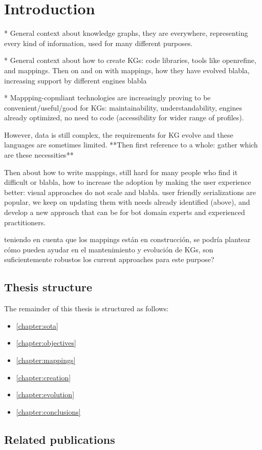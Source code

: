 \chapter{Introduction}
\label{chapter:intro}


* General context about knowledge graphs, they are everywhere, representing every kind of information, used for many different purposes. 

* General context about how to create KGs: code libraries, tools like openrefine, and mappings. Then on and on with mappings, how they have evolved blabla, increasing support by different engines blabla

* Mappping-copmliant technologies are increasingly proving to be convenient/useful/good for KGs: maintainability, understandability, engines already optimized, no need to code (accessibility for wider range of profiles). 

However, data is still complex, the requirements for KG evolve and these languages are sometimes limited. **Then first reference to a whole: gather which are these necessities**

Then about how to write mappings, still hard for many people who find it difficult or blabla, how to increase the adoption by making the user experience better: visual approaches do not scale and blabla. user friendly serializations are popular, we keep on updating them with needs already identified (above), and develop a new approach that can be for bot domain experts and experienced practitioners.

 teniendo en cuenta que los mappings están en construcción, se podría plantear cómo pueden ayudar en el mantenimiento y evolución de KGs, son suficientemente robustos los current approaches para este purpose?

\section{Thesis structure}

The remainder of this thesis is structured as follows:

\begin{itemize}
    \item \cref{chapter:sota}
    \item \cref{chapter:objectives}
    \item \cref{chapter:mappings}
    \item \cref{chapter:creation}
    \item \cref{chapter:evolution}
    \item \cref{chapter:conclusions}
\end{itemize}


\section{Related publications}



